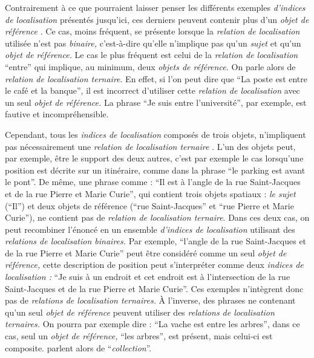 Contrairement à ce que pourraient laisser penser les différents
exemples \emph{d'indices de localisation} présentés jusqu'ici, ces
derniers peuvent contenir plus d'un \emph{objet de référence}
\autocite{Clementini2013}. Ce cas, moins fréquent, se présente lorsque
la \emph{relation de localisation} utilisée n'est pas \emph{binaire,}
c'est-à-dire qu'elle n'implique pas qu'un \emph{sujet} et qu'un
\emph{objet de référence.} Le cas le plus fréquent est celui de la
\emph{relation de localisation} \enquote{entre} qui implique, au
minimum, deux \emph{objets de référence.} On parle alors de
\emph{relation de localisation ternaire}. En effet, si l'on peut dire
que \enquote{La poste est entre le café et la banque}, il est
incorrect d'utiliser cette \emph{relation de localisation} avec un
seul \emph{objet de référence.} La phrase \enquote{Je suis entre
  l'université}, par exemple, est fautive et incompréhensible.

Cependant, tous les \emph{indices de localisation} composés de trois
objets, n'impliquent pas nécessairement une \emph{relation de
  localisation ternaire} \autocite{Duchene2019}. L'un des objets peut,
par exemple, être le support des deux autres, c'est par exemple le cas
lorsqu'une position est décrite sur un itinéraire, comme dans la
phrase \enquote{le parking est avant le pont}. De même, une phrase
comme : \enquote{Il est à l'angle de la rue Saint-Jacques et de la rue
  Pierre et Marie Curie}, qui contient trois objets spatiaux :
\emph{le sujet} (\enquote{Il}) et deux objets de référence
(\enquote{rue Saint-Jacques} et \enquote{rue Pierre et Marie Curie}),
ne contient pas de \emph{relation de localisation ternaire}. Dans ces
deux cas, on peut recombiner l'énoncé en un ensemble \emph{d'indices
  de localisation} utilisant des \emph{relations de localisation
  binaires.} Par exemple, \enquote{l'angle de la rue Saint-Jacques et
  de la rue Pierre et Marie Curie} peut être considéré comme un seul
\emph{objet de référence,} cette description de position peut
s'interpréter comme deux \emph{indices de localisation :} \enquote{Je
  suis à un endroit et cet endroit est à l'intersection de la rue
  Saint-Jacques et de la rue Pierre et Marie Curie}. Ces exemples
n’intègrent donc pas de \emph{relations de localisation ternaires.} À
l'inverse, des phrases ne contenant qu'un seul \emph{objet de
  référence} peuvent utiliser des \emph{relations de localisation
  ternaires.} On pourra par exemple dire : \enquote{La vache est entre
  les arbres}, dans ce cas, seul un \emph{objet de référence,}
\enquote{les arbres}, est présent, mais celui-ci est composite.
\textcite{Aurnague1993} parlent alors de \enquote{\emph{collection}}.


